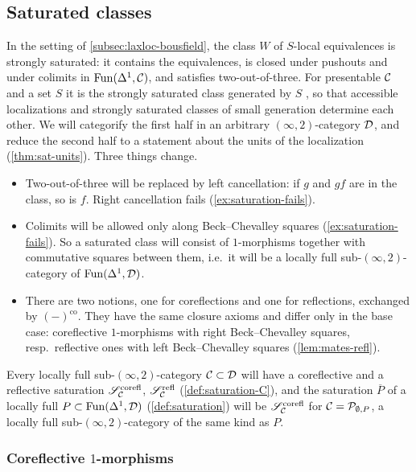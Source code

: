 \subsection{Saturated classes}
\label{subsec:2dloc-saturation}

%
In the setting of \cref{subsec:laxloc-bousfield},
the class $W$ of $S$-local equivalences is strongly saturated:
it contains the equivalences, is closed under pushouts and under colimits in
$\operatorname{Fun}(\Delta^{1},\mathcal{C})$, and satisfies two-out-of-three.
For presentable $\mathcal{C}$ and a set $S$ it is the strongly saturated class generated
by $S$ \cite[5.5.4.15]{htt}, so that accessible localizations and strongly
saturated classes of small generation determine each other.
We will categorify the first half in an arbitrary $(\infty,2)$-category $\mathcal{D}$,
and reduce the second half to a statement about the units of the localization
(\cref{thm:sat-units}). Three things change.
\begin{itemize}
%
\item Two-out-of-three will be replaced by left cancellation:
if $g$ and $gf$ are in the class, so is $f$.
Right cancellation fails (\cref{ex:saturation-fails}).
\item Colimits will be allowed only along Beck--Chevalley squares
(\cref{ex:saturation-fails}). So a saturated class will consist of $1$-morphisms
together with commutative squares between them,
i.e.\ it will be a locally full sub-$(\infty,2)$-category of
$\operatorname{Fun}(\Delta^{1},\mathcal{D})$.
\item There are two notions, one for coreflections and one for reflections,
exchanged by $(-)^{\mathrm{co}}$. They have the same closure axioms and differ
only in the base case: coreflective $1$-morphisms with right Beck--Chevalley
squares, resp.\ reflective ones with left Beck--Chevalley squares
(\cref{lem:mates-refl}).
\end{itemize}
%
Every locally full sub-$(\infty,2)$-category $\mathcal{C} \subset \mathcal{D}$ will have a
coreflective and a reflective saturation
$\mathscr{S}^{\mathrm{corefl}}_{\mathcal{C}}$,
$\mathscr{S}^{\mathrm{refl}}_{\mathcal{C}}$
(\cref{def:saturation-C}), and the saturation $\overline{P}$ of a locally full
$P \subset \operatorname{Fun}(\Delta^{1},\mathcal{D})$
(\cref{def:saturation}) will be
$\mathscr{S}^{\mathrm{corefl}}_{\mathcal{C}}$
for
$\mathcal{C} = \mathcal{P}_{\emptyset,P}$,
a locally full sub-$(\infty,2)$-category of the same kind as $P$.

\subsubsection*{Coreflective $1$-morphisms}

